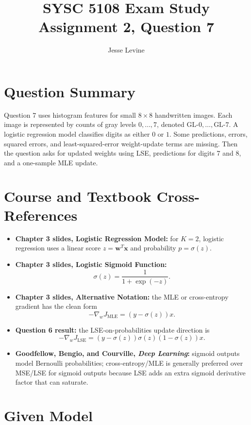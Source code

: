 \documentclass[11pt]{article}
\title{SYSC 5108 Exam Study\\Assignment 2, Question 7}
\author{Jesse Levine}
\date{}
\begin{document}
\maketitle

\section*{Question Summary}

Question 7 uses histogram features for small \(8\times 8\) handwritten images.
Each image is represented by counts of gray levels \(0,\ldots,7\), denoted
\(\text{GL-0},\ldots,\text{GL-7}\). A logistic regression model classifies digits
as either \(0\) or \(1\). Some predictions, errors, squared errors, and
least-squared-error weight-update terms are missing. Then the question asks for
updated weights using LSE, predictions for digits 7 and 8, and a one-sample MLE
update.

\section*{Course and Textbook Cross-References}

\begin{itemize}
    \item \textbf{Chapter 3 slides, Logistic Regression Model:} for \(K=2\),
    logistic regression uses a linear score \(z=\mathbf{w}^T\mathbf{x}\) and
    probability \(p=\sigma(z)\).
    \item \textbf{Chapter 3 slides, Logistic Sigmoid Function:}
    \[
        \sigma(z)=\frac{1}{1+\exp(-z)}.
    \]
    \item \textbf{Chapter 3 slides, Alternative Notation:} the MLE or
    cross-entropy gradient has the clean form
    \[
        -\nabla_w J_{\text{MLE}} = (y-\sigma(z))x.
    \]
    \item \textbf{Question 6 result:} the LSE-on-probabilities update direction is
    \[
        -\nabla_w J_{\text{LSE}} = (y-\sigma(z))\sigma(z)(1-\sigma(z))x.
    \]
    \item \textbf{Goodfellow, Bengio, and Courville, \emph{Deep Learning}:}
    sigmoid outputs model Bernoulli probabilities; cross-entropy/MLE is generally
    preferred over MSE/LSE for sigmoid outputs because LSE adds an extra sigmoid
    derivative factor that can saturate.
\end{itemize}

\section*{Given Model}
\end{document}
